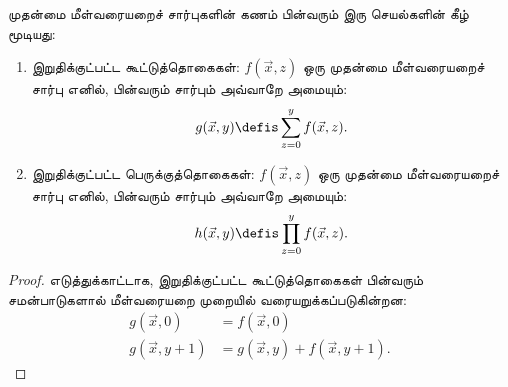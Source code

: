 \documentclass[../../../include/open-logic-section]{subfiles}
\begin{document}
\begin{prop}
முதன்மை மீள்வரையறைச் சார்புகளின் கணம் பின்வரும் இரு செயல்களின்
கீழ் மூடியது:
\begin{enumerate}
\item இறுதிக்குட்பட்ட கூட்டுத்தொகைகள்: $f(\vec x, z)$ ஒரு முதன்மை
மீள்வரையறைச் சார்பு எனில், பின்வரும் சார்பும் அவ்வாறே அமையும்:
\[
g(\vec x, y) \defis \sum_{z = 0}^y f(\vec x, z).
\]
\item இறுதிக்குட்பட்ட பெருக்குத்தொகைகள்: $f(\vec x, z)$ ஒரு முதன்மை
மீள்வரையறைச் சார்பு எனில், பின்வரும் சார்பும் அவ்வாறே அமையும்:
\[
h(\vec x, y) \defis \prod_{z = 0}^y f(\vec x, z).
\]
\end{enumerate}
\end{prop}

\begin{proof}
எடுத்துக்காட்டாக, இறுதிக்குட்பட்ட கூட்டுத்தொகைகள் பின்வரும்
சமன்பாடுகளால் மீள்வரையறை முறையில் வரையறுக்கப்படுகின்றன:
\begin{align*}
  g(\vec x, 0) & = f(\vec x, 0)\\
  g(\vec x, y+1) & = g(\vec x, y) + f(\vec x, y+1).
\end{align*}
\end{proof}
\end{document}
